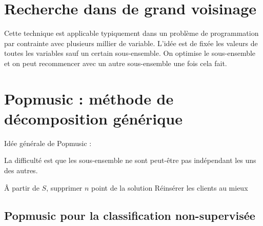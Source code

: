 \documentclass[11pt,a4paper]{report}
\begin{document}
\section{Recherche dans de grand voisinage}

Cette technique est applicable typiquement dans un problème de programmation par contrainte avec plusieurs millier de variable. L'idée est de fixée les valeurs de toutes les variables sauf un certain sous-ensemble. On optimise le sous-ensemble et on peut recommencer avec un autre sous-ensemble une fois cela fait.

\section{Popmusic : méthode de décomposition générique}

Idée générale de Popmusic :

\begin{algorithm}[H]
\end{algorithm}

La difficulté est que les sous-ensemble ne sont peut-être pas indépendant les uns des autres.

\begin{algorithm}[H]
\end{algorithm}

\begin{algorithm}[H]
Â partir de $S$, supprimer $n$ point de la solution\;
Réinsérer les clients au mieux\; 
\end{algorithm}

\subsection{Popmusic pour la classification non-supervisée}
\end{document}
